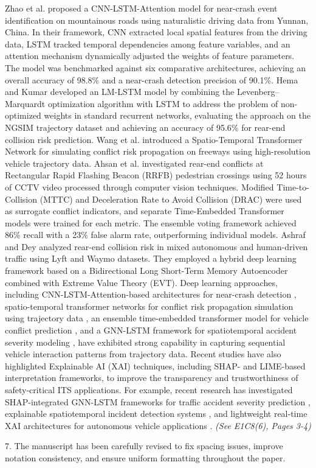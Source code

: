 \documentclass[12pt]{article}
\begin{document}
\begin{enumerate}
Zhao et al. \cite{zhao2024cnn} proposed a CNN-LSTM-Attention model for near-crash event identification on mountainous roads using naturalistic driving data from Yunnan, China. In their framework, CNN extracted local spatial features from the driving data, LSTM tracked temporal dependencies among feature variables, and an attention mechanism dynamically adjusted the weights of feature parameters. The model was benchmarked against six comparative architectures, achieving an overall accuracy of 98.8\% and a near-crash detection precision of 90.1\%. Hema and Kumar \cite{hema2022levenberg} developed an LM-LSTM model by combining the Levenberg–Marquardt optimization algorithm with LSTM to address the problem of non-optimized weights in standard recurrent networks, evaluating the approach on the NGSIM trajectory dataset and achieving an accuracy of 95.6\% for rear-end collision risk prediction. Wang et al. \cite{wang2024spatio} introduced a Spatio-Temporal Transformer Network for simulating conflict risk propagation on freeways using high-resolution vehicle trajectory data. Ahsan et al. \cite{ahsan2025ensemble} investigated rear-end conflicts at Rectangular Rapid Flashing Beacon (RRFB) pedestrian crossings using 52 hours of CCTV video processed through computer vision techniques. Modified Time-to-Collision (MTTC) and Deceleration Rate to Avoid Collision (DRAC) were used as surrogate conflict indicators, and separate Time-Embedded Transformer models were trained for each metric. The ensemble voting framework achieved 86\% recall with a 23\% false alarm rate, outperforming individual models. Ashraf and Dey \cite{ashraf2025rear} analyzed rear-end collision risk in mixed autonomous and human-driven traffic using Lyft and Waymo datasets. They employed a hybrid deep learning framework based on a Bidirectional Long Short-Term Memory Autoencoder combined with Extreme Value Theory (EVT). Deep learning approaches, including CNN-LSTM-Attention-based architectures for near-crash detection \cite{zhao2024cnn}, spatio-temporal transformer networks for conflict risk propagation simulation using trajectory data \cite{wang2024spatio}, an ensemble time-embedded transformer model for vehicle conflict prediction \cite{ahsan2025ensemble}, and a GNN-LSTM framework for spatiotemporal accident severity modeling \cite{alnowaiser2025computational}, have exhibited strong capability in capturing sequential vehicle interaction patterns from trajectory data. Recent studies have also highlighted Explainable AI (XAI) techniques, including SHAP- and LIME-based interpretation frameworks, to improve the transparency and trustworthiness of safety-critical ITS applications. For example, recent research has investigated SHAP-integrated GNN-LSTM frameworks for traffic accident severity prediction \cite{alnowaiser2025computational}, explainable spatiotemporal incident detection systems \cite{zhai2025toward}, and lightweight real-time XAI architectures for autonomous vehicle applications \cite{tahir2024novel}. \textit{(See E1C8(6), Pages 3-4)}

7. The manuscript has been carefully revised to fix spacing issues, improve notation consistency, and ensure uniform formatting throughout the paper.
\end{enumerate}	

\vspace{1.5cm}  %


\end{document}
